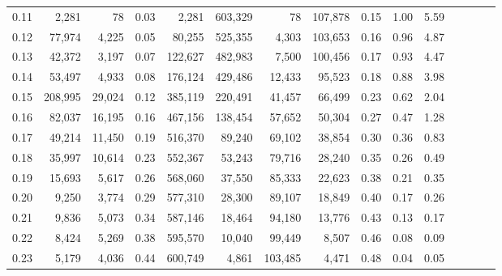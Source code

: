 \begin{tabular}{rrrcrrrrrrrrrrr}
0.11 &    2,281 &      78 &                                       0.03 &    2,281 &  603,329 &       78 &  107,878 &  0.15 &  1.00 &                         5.59 \\
0.12 &   77,974 &   4,225 &                                       0.05 &   80,255 &  525,355 &    4,303 &  103,653 &  0.16 &  0.96 &                         4.87 \\
0.13 &   42,372 &   3,197 &                                       0.07 &  122,627 &  482,983 &    7,500 &  100,456 &  0.17 &  0.93 &                         4.47 \\
0.14 &   53,497 &   4,933 &                                       0.08 &  176,124 &  429,486 &   12,433 &   95,523 &  0.18 &  0.88 &                         3.98 \\
0.15 &  208,995 &  29,024 &                                       0.12 &  385,119 &  220,491 &   41,457 &   66,499 &  0.23 &  0.62 &                         2.04 \\
0.16 &   82,037 &  16,195 &                                       0.16 &  467,156 &  138,454 &   57,652 &   50,304 &  0.27 &  0.47 &                         1.28 \\
0.17 &   49,214 &  11,450 &                                       0.19 &  516,370 &   89,240 &   69,102 &   38,854 &  0.30 &  0.36 &                         0.83 \\
0.18 &   35,997 &  10,614 &                                       0.23 &  552,367 &   53,243 &   79,716 &   28,240 &  0.35 &  0.26 &                         0.49 \\
0.19 &   15,693 &   5,617 &                                       0.26 &  568,060 &   37,550 &   85,333 &   22,623 &  0.38 &  0.21 &                         0.35 \\
0.20 &    9,250 &   3,774 &                                       0.29 &  577,310 &   28,300 &   89,107 &   18,849 &  0.40 &  0.17 &                         0.26 \\
0.21 &    9,836 &   5,073 &                                       0.34 &  587,146 &   18,464 &   94,180 &   13,776 &  0.43 &  0.13 &                         0.17 \\
0.22 &    8,424 &   5,269 &                                       0.38 &  595,570 &   10,040 &   99,449 &    8,507 &  0.46 &  0.08 &                         0.09 \\
0.23 &    5,179 &   4,036 &                                       0.44 &  600,749 &    4,861 &  103,485 &    4,471 &  0.48 &  0.04 &                         0.05 \\

\end{tabular}

